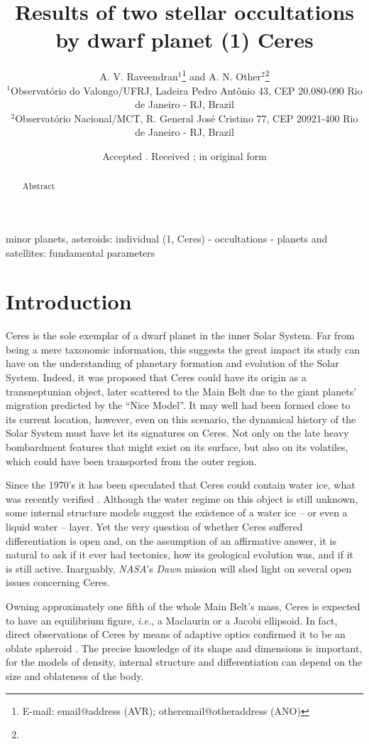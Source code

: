 \documentclass[useAMS,usenatbib]{mn2e}
\title[Results of two stellar occultations by Ceres]{Results of two stellar occultations by dwarf planet (1) Ceres}
\author[A. V. Raveendran and A. N. Other]{A. V. Raveendran$^{1}$\thanks{E-mail:
email@address (AVR); otheremail@otheraddress (ANO)} and A. N.
Other$^{2}$\footnotemark[1]\thanks{}\\
$^{1}$Observat\'orio do Valongo/UFRJ, Ladeira Pedro Ant\^onio 43,
CEP 20.080-090 Rio de Janeiro - RJ, Brazil\\
$^{2}$Observat\'orio Nacional/MCT, R. General Jos\'e Cristino 77,
CEP 20921-400 Rio de Janeiro - RJ, Brazil}
\begin{document}
\date{Accepted . Received ; in original form }

\pagerange{\pageref{firstpage}--\pageref{lastpage}} 

\maketitle

\label{firstpage}

\begin{abstract}
Abstract
\end{abstract}

\begin{keywords}
minor planets, asteroids: individual (1, Ceres) - occultations - planets and satellites: fundamental parameters
\end{keywords}

\section{Introduction}

Ceres is the sole exemplar of a dwarf planet in the inner Solar System. Far from being a mere taxonomic information, this suggests the great impact its study can have on the understanding of planetary formation and evolution of the Solar System. Indeed, it was proposed that Ceres could have its origin as a transneptunian object, later scattered to the Main Belt due to the giant planets' migration predicted by the ``Nice Model''. It may well had been formed close to its current location, however, even on this scenario, the dynamical history of the Solar System must have let its signatures on Ceres. Not only on the late heavy bombardment features that might exist on its surface, but also on its volatiles, which could have been transported from the outer region.

Since the 1970's it has been speculated that Ceres could contain water ice, what was recently verified \citep{Kuppers2014}. Although the water regime on this object is still unknown, some internal structure models suggest the existence of a water ice -- or even a liquid water -- layer. Yet the very question of whether Ceres suffered differentiation is open and, on the assumption of an affirmative answer, it is natural to ask if it ever had tectonics, how its geological evolution was, and if it is still active. Inarguably, \textit{NASA}'s \textit{Dawn} mission will shed light on several open issues concerning Ceres.

Owning approximately one fifth of the whole Main Belt's mass, Ceres is expected to have an equilibrium figure, \textit{i.e.}, a Maclaurin or a Jacobi ellipsoid. In fact, direct observations of Ceres by means of adaptive optics confirmed it to be an oblate spheroid \citep{Drummond2014}. The precise knowledge of its shape and dimensions is important, for the models of density, internal structure and differentiation can depend on the size and oblateness of the body.
\end{document}
